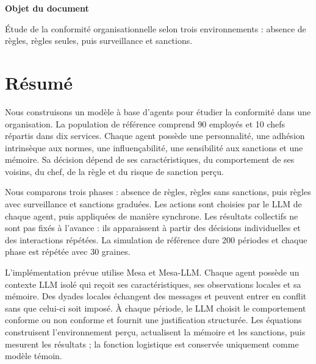 \documentclass[10pt,a4paper]{article}
\begin{document}
\begin{titlepage}
\begin{center}
\vspace{22mm}
\begin{tcolorbox}[
  width=0.78\textwidth,colback=white,colframe=Rule,boxrule=0.8pt,arc=1mm,
  left=6mm,right=6mm,top=4mm,bottom=4mm]
{\sffamily\small\bfseries\color{Navy}Objet du document}\par
\vspace{1mm}
\small
Étude de la conformité organisationnelle selon trois environnements :
absence de règles, règles seules, puis surveillance et sanctions.
\end{tcolorbox}
\end{center}

\end{titlepage}

\hypersetup{pageanchor=true}

\section*{Résumé}

Nous construisons un modèle à base d’agents pour étudier la conformité dans une
organisation. La population de référence comprend 90 employés et 10 chefs
répartis dans dix services. Chaque agent possède une personnalité, une adhésion
intrinsèque aux normes, une influençabilité, une sensibilité aux sanctions et
une mémoire. Sa décision dépend de ses caractéristiques, du comportement de ses
voisins, du chef, de la règle et du risque de sanction perçu.

Nous comparons trois phases : absence de règles, règles sans sanctions, puis
règles avec surveillance et sanctions graduées. Les actions sont choisies par
le LLM de chaque agent, puis appliquées de manière synchrone. Les résultats
collectifs ne sont pas fixés à l’avance : ils apparaissent à partir des
décisions individuelles et des interactions répétées. La simulation de
référence dure 200 périodes et chaque phase est répétée avec 30 graines.

L’implémentation prévue utilise Mesa et Mesa-LLM. Chaque agent possède un
contexte LLM isolé qui reçoit ses caractéristiques, ses observations locales
et sa mémoire. Des dyades locales échangent des messages et peuvent entrer en
conflit sans que celui-ci soit imposé. À chaque période, le LLM choisit le
comportement conforme ou non conforme et fournit une justification structurée.
Les équations construisent l’environnement perçu, actualisent la mémoire et les
sanctions, puis mesurent les résultats ; la fonction logistique est conservée
uniquement comme modèle témoin.
\end{document}
